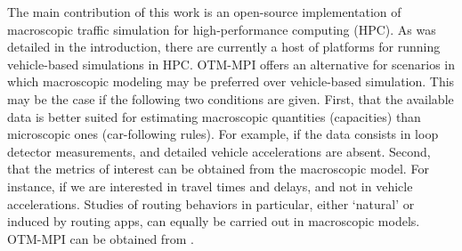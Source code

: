The main contribution of this work is an open-source implementation of macroscopic traffic simulation for high-performance computing (HPC). As was detailed in the introduction, there are currently a host of platforms for running vehicle-based simulations in HPC. OTM-MPI offers an alternative for scenarios in which macroscopic modeling may be preferred over vehicle-based simulation. This may be the case if the following two conditions are given. First, that the available data is better suited for estimating macroscopic quantities (capacities) than microscopic ones (car-following rules). For example, if the data consists in loop detector measurements, and detailed vehicle accelerations are absent. Second, that the metrics of interest can be obtained from the macroscopic model. For instance, if we are interested in travel times and delays, and not in vehicle accelerations. Studies of routing behaviors in particular, either `natural' or induced by routing apps, can equally be carried out in macroscopic models. OTM-MPI can be obtained from \cite{otmmpi}.